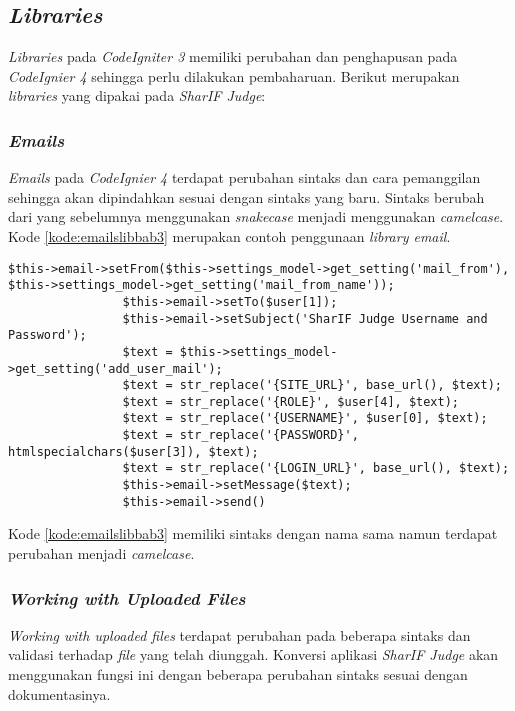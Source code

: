 \subsection{\textit{Libraries}}
\textit{Libraries} pada \textit{CodeIgniter 3} memiliki perubahan dan penghapusan pada \textit{CodeIgnier 4} sehingga perlu dilakukan pembaharuan. Berikut merupakan \textit{libraries} yang dipakai pada \textit{SharIF Judge}:

\subsubsection{\textit{Emails}}
\textit{Emails} pada \textit{CodeIgnier 4} terdapat perubahan sintaks dan cara pemanggilan sehingga akan dipindahkan sesuai dengan sintaks yang baru. Sintaks berubah dari yang sebelumnya menggunakan \textit{snakecase} menjadi menggunakan \textit{camelcase}. Kode \ref{kode:emailslibbab3} merupakan contoh penggunaan \textit{library email}.

\begin{lstlisting}[caption=Contoh perubahan \textit{library emails}, label=kode:emailslibbab3]
$this->email->setFrom($this->settings_model->get_setting('mail_from'), $this->settings_model->get_setting('mail_from_name'));
				$this->email->setTo($user[1]);
				$this->email->setSubject('SharIF Judge Username and Password');
				$text = $this->settings_model->get_setting('add_user_mail');
				$text = str_replace('{SITE_URL}', base_url(), $text);
				$text = str_replace('{ROLE}', $user[4], $text);
				$text = str_replace('{USERNAME}', $user[0], $text);
				$text = str_replace('{PASSWORD}', htmlspecialchars($user[3]), $text);
				$text = str_replace('{LOGIN_URL}', base_url(), $text);
				$this->email->setMessage($text);
				$this->email->send()
\end{lstlisting}

Kode \ref{kode:emailslibbab3} memiliki sintaks dengan nama sama namun terdapat perubahan menjadi \textit{camelcase}.

\subsubsection{\textit{Working with Uploaded Files}}
\textit{Working with uploaded files} terdapat perubahan pada beberapa sintaks dan validasi terhadap \textit{file} yang telah diunggah. Konversi aplikasi \textit{SharIF Judge} akan menggunakan fungsi ini dengan beberapa perubahan sintaks sesuai dengan dokumentasinya.

